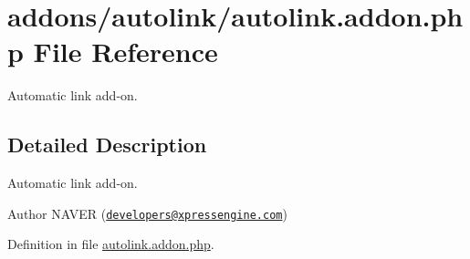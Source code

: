 \hypertarget{autolink_8addon_8php}{\section{addons/autolink/autolink.addon.\-php File Reference}
\label{autolink_8addon_8php}
}


Automatic link add-\/on.  




\subsection{Detailed Description}
Automatic link add-\/on. \begin{DoxyAuthor}{Author}
N\-A\-V\-E\-R (\href{mailto:developers@xpressengine.com}{\tt developers@xpressengine.\-com}) 
\end{DoxyAuthor}


Definition in file \hyperlink{autolink_8addon_8php_source}{autolink.\-addon.\-php}.

